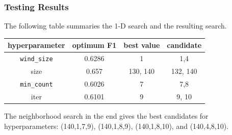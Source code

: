\documentclass{sig-alternate-05-2015}
\begin{document}
	\subsubsection{Testing Results}
	The following table summaries the 1-D search and the resulting search. \\
	\begin{tabular}{|c|c|c|c|}
		\hline 
		hyperparameter & optimum F1 & best value & candidate \\
		\hline 
		\texttt{wind\_size} &  0.6286 & 1 & 1,4\\ 
		\hline 
		size & 0.657 & 130, 140  & 132, 140 \\
		\hline 
		\texttt{min\_count} & 0.6026 & 7 & 7,8 \\
		\hline 
		iter & 0.6101 & 9 & 9, 10 \\
		\hline 
	\end{tabular}
	The neighborhood search in the end gives the best candidates for hyperparameters: (140,1,7,9), (140,1,8,9), (140,1,8,10), and (140,4,8,10).
	
\end{document}
